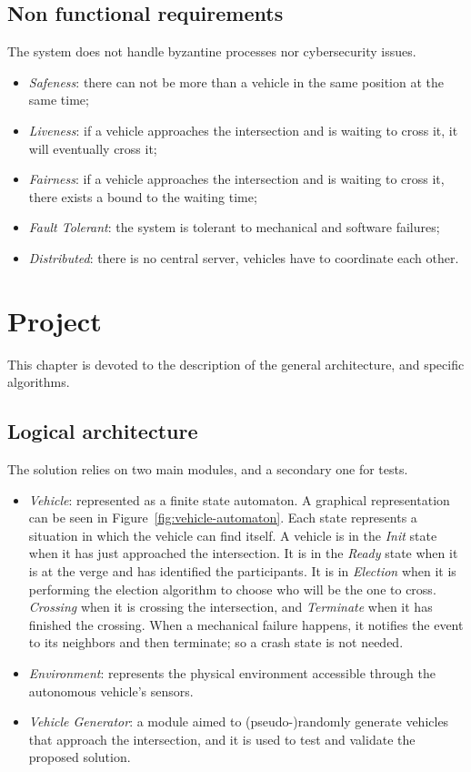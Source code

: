 \documentclass{memoir}
\begin{document}
\section{Non functional requirements}
The system does not handle byzantine processes nor cybersecurity issues.

\begin{itemize}
	\item \emph{Safeness}: there can not be more than a vehicle in the same position at the same time;
	\item \emph{Liveness}: if a vehicle approaches the intersection and is waiting to cross it, it will eventually cross it;
	\item \emph{Fairness}: if a vehicle approaches the intersection and is waiting to cross it, there exists a bound to the waiting time;
	\item \emph{Fault Tolerant}: the system is tolerant to mechanical and software failures;
	\item \emph{Distributed}: there is no central server, vehicles have to coordinate each other.
\end{itemize}



\chapter{Project}\label{ch:project}
This chapter is devoted to the description of the general architecture, and specific algorithms.

\section{Logical architecture}
The solution relies on two main modules, and a secondary one for tests.

\begin{itemize}
	\item \emph{Vehicle}: represented as a finite state automaton. A graphical representation can be seen in Figure~\ref{fig:vehicle-automaton}. Each state represents a situation in which the vehicle can find itself. A vehicle is in the \emph{Init} state when it has just approached the intersection. It is in the \emph{Ready} state when it is at the verge and has identified the participants. It is in \emph{Election} when it is performing the election algorithm to choose who will be the one to cross. \emph{Crossing} when it is crossing the intersection, and \emph{Terminate} when it has finished the crossing. When a mechanical failure happens, it notifies the event to its neighbors and then terminate; so a crash state is not needed.
	\item \emph{Environment}: represents the physical environment accessible through the autonomous vehicle's sensors.
	\item \emph{Vehicle Generator}: a module aimed to (pseudo-)randomly generate vehicles that approach the intersection, and it is used to test and validate the proposed solution.
\end{itemize}
\end{document}
